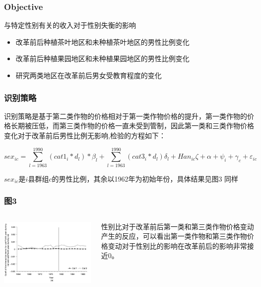 \documentclass{beamer}
\begin{document}
\begin{frame}
	\frametitle{Objective}
  与特定性别有关的收入对于性别失衡的影响
    \begin{itemize}
        \item 改革前后种植茶叶地区和未种植茶叶地区的男性比例变化
        \item 改革前后种植果园地区和未种植果园地区的男性比例变化
        \item 研究两类地区在改革前后男女受教育程度的变化
    \end{itemize}
\end{frame}


\begin{frame}
	\frametitle{识别策略}
识别策略是基于第二类作物的价格相对于第一类作物价格的提升，第一类作物的价格长期被压低，而第三类作物的价格一直未受到管制，因此第一类和三类作物价格变化对于改革前后男性比例无影响,检验的方程如下：
\begin{small}
\begin{equation}
    sex_{ic}=\sum_{l=1963}^{1990}(cat1_i*d_l)*\beta_l+\sum_{l=1963}^{1990}(cat3_i*d_l)\delta_l+Han_{ic}\zeta+\alpha+\psi_i+\gamma_c+\varepsilon_{ic}
\end{equation}
\end{small}
$sex_{ic}$是$i$县群组$c$的男性比例，其余以1962年为初始年份，具体结果见图3
同样
\end{frame}

\begin{frame}
	\frametitle{图3}
    \begin{columns}
            \begin{minipage}[c][0.4\textheight][c]{\linewidth}
                \centering
                \includegraphics[width=0.8\linewidth]{figure3_a}
            \end{minipage}
            \begin{minipage}[c][0.4\textheight][c]{\linewidth}
          性别比对于改革前后第一类和第三类作物价格变动产生的反应，可以看出第一类作物和第三类作物价格变动对于性别比的影响在改革前后的影响非常接近0。
            \end{minipage}
    \end{columns}
\end{frame}
\end{document}
